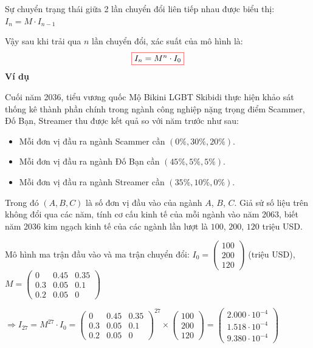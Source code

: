 \documentclass[twoside,final]{hcmut-report}
\newcommand{\exercise}[1]{\begin{exercisebox}#1\end{exercisebox}}
\newcommand{\result}[1]{\fcolorbox{red}{white}{#1}}
\begin{document}
Sự chuyển trạng thái giữa 2 lần chuyển đổi liên tiếp nhau được biểu thị: $I_{n} = M\cdot I_{n-1}$\par
Vậy sau khi trải qua $n$ lần chuyển đổi, xác suất của mô hình là: \[\result{$I_{n} = M^n\cdot I_0$}\]
\textbf{Ví dụ}
\exercise{Cuối năm 2036, tiểu vương quốc Mộ Bikini LGBT Skibidi thực hiện khảo sát thống kê thành phần chính trong ngành công nghiệp nặng trọng điểm Scammer, Đố Bạn, Streamer thu được kết quả so với năm trước như sau:
    \begin{itemize}[itemsep=0pt, topsep=0pt, parsep=0pt,label=-]
        \item Mỗi đơn vị đầu ra ngành Scammer cần $(0\%, 30\%, 20\%)$.
        \item Mỗi đơn vị đầu ra ngành Đố Bạn cần $(45\%, 5\%, 5\%)$.
        \item Mỗi đơn vị đầu ra ngành Streamer cần $(35\%, 10\%, 0\%)$.
    \end{itemize}

    Trong đó $(A, B, C)$ là số đơn vị đầu vào của ngành $A$, $B$, $C$. Giả sử số liệu trên không đổi qua các năm, tính cơ cấu kinh tế của mỗi ngành vào năm 2063, biết năm 2036 kim ngạch kinh tế của các ngành lần lượt là $100$, $200$, $120$ triệu USD.
}
Mô hình ma trận đầu vào và ma trận chuyển đổi: $I_0 = \begin{pmatrix}
        100 \\
        200 \\
        120
    \end{pmatrix}$ (triệu USD), $M = \begin{pmatrix}
        0   & 0.45 & 0.35 \\
        0.3 & 0.05 & 0.1  \\
        0.2 & 0.05 & 0
    \end{pmatrix}$

$\Rightarrow I_{27} = M^{27}\cdot I_0 = \begin{pmatrix}
        0   & 0.45 & 0.35 \\
        0.3 & 0.05 & 0.1  \\
        0.2 & 0.05 & 0
    \end{pmatrix}^{27} \times \begin{pmatrix}
        100 \\
        200 \\
        120
    \end{pmatrix} = \begin{pmatrix}
        2.000\cdot 10^{-4} \\
        1.518\cdot 10^{-4} \\
        9.380\cdot 10^{-4}
    \end{pmatrix}$
\end{document}
